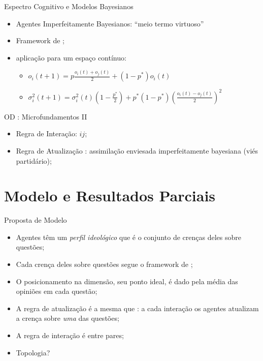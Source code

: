 \documentclass{beamer}
\begin{document}
\begin{frame}{Espectro Cognitivo e Modelos Bayesianos}
  \begin{itemize}
  \item Agentes Imperfeitamente Bayesianos: ``meio termo virtuoso''
  \item Framework de \textcite{martins2012bayesian};
  \item \textcite{martins2009bayesian} aplicação para um espaço contínuo:
    \begin{itemize}
    \item    \( o_i(t+1)
    =
    p
    \frac{o_i(t) + o_j(t)}{2}
    +
    (1-p^*)o_i(t) \)
    \item \(    \sigma_i^2(t+1)
    =
    \sigma_i^2(t)
    (1 - \frac{p^*}{2})
    +
    p^*
    (1-p^*)
    (\frac{o_i(t)-o_j(t)}{2})^2\)
    \end{itemize}
  \end{itemize}
\end{frame}

\begin{frame}{OD : Microfundamentos II}
  \begin{itemize}
  \item Regra de Interação: \(ij\);
  \item Regra de Atualização : assimilação enviesada imperfeitamente bayesiana
    (viés partidário);
  \end{itemize}
\end{frame}

\section{Modelo e Resultados Parciais}
\begin{frame}{Proposta de Modelo}
  \begin{itemize}
  \item Agentes têm um \textit{perfil ideológico} que é o conjunto de crenças
    deles sobre questões;
  \item Cada crença deles sobre questões segue o framework de
    \textcite{martins2012bayesian};
  \item O posicionamento na dimensão, seu ponto ideal, é dado pela média das
    opiniões em cada questão;
  \item A regra de atualização é a mesma que \textcite{martins2009bayesian}: a
    cada interação os agentes atualizam a crença sobre \textit{uma} das
    questões;
  \item A regra de interação é entre pares;
    \item Topologia?
  \end{itemize}
\end{frame}
\end{document}
